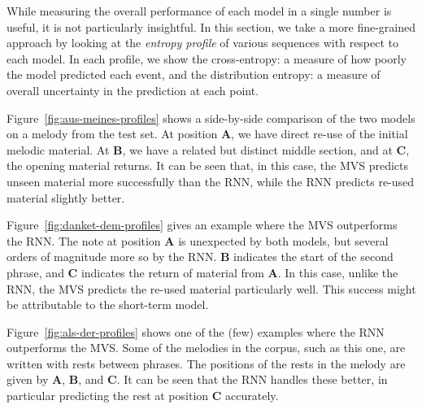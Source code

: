 \documentclass[12pt,a4paper,twoside,openright]{report}
\begin{document}
While measuring the overall performance of each model in a single number is
useful, it is not particularly insightful. In this section, we take a more
fine-grained approach by looking at the \emph{entropy profile} of various
sequences with respect to each model. In each profile, we show the
cross-entropy: a measure of how poorly the model predicted each event, and the
distribution entropy: a measure of overall uncertainty in the prediction at each
point.

Figure~\ref{fig:aus-meines-profiles} shows a side-by-side comparison of the two
models on a melody from the test set. At position \textbf{A}, we have direct
re-use of the initial melodic material. At \textbf{B}, we have a related but
distinct middle section, and at \textbf{C}, the opening material returns. It can
be seen that, in this case, the MVS predicts unseen material more successfully
than the RNN, while the RNN predicts re-used material slightly better.

Figure~\ref{fig:danket-dem-profiles} gives an example where the MVS outperforms
the RNN. The note at position \textbf{A} is unexpected by both models, but
several orders of magnitude more so by the RNN. \textbf{B} indicates the start
of the second phrase, and \textbf{C} indicates the return of material from
\textbf{A}. In this case, unlike the RNN, the MVS predicts the re-used material
particularly well. This success might be attributable to the short-term model.

Figure~\ref{fig:als-der-profiles} shows one of the (few) examples where the RNN
outperforms the MVS. Some of the melodies in the corpus, such as this one, are
written with rests between phrases. The positions of the rests in the melody
are given by \textbf{A}, \textbf{B}, and \textbf{C}. It can be seen that the RNN
handles these better, in particular predicting the rest at position \textbf{C}
accurately.
\end{document}
